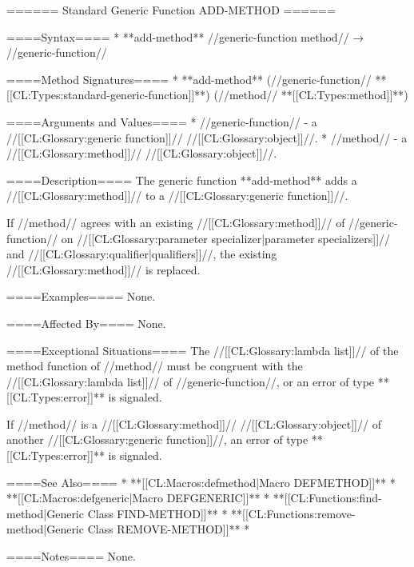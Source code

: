 ====== Standard Generic Function ADD-METHOD ======

====Syntax====
  * **add-method** //generic-function method// → //generic-function//

====Method Signatures====
  * **add-method** (//generic-function// **[[CL:Types:standard-generic-function]]**) (//method// **[[CL:Types:method]]**)

====Arguments and Values====
  * //generic-function// - a //[[CL:Glossary:generic function]]// //[[CL:Glossary:object]]//.
  * //method// - a //[[CL:Glossary:method]]// //[[CL:Glossary:object]]//.

====Description====
The generic function **add-method** adds a //[[CL:Glossary:method]]// to a //[[CL:Glossary:generic function]]//.

If //method// agrees with an existing //[[CL:Glossary:method]]// of //generic-function// on //[[CL:Glossary:parameter specializer|parameter specializers]]// and //[[CL:Glossary:qualifier|qualifiers]]//, the existing //[[CL:Glossary:method]]// is replaced.

====Examples====
None.

====Affected By====
None.

====Exceptional Situations====
The //[[CL:Glossary:lambda list]]// of the method function of //method// must be congruent with the //[[CL:Glossary:lambda list]]// of //generic-function//, or an error of type **[[CL:Types:error]]** is signaled.

If //method// is a //[[CL:Glossary:method]]// //[[CL:Glossary:object]]// of another //[[CL:Glossary:generic function]]//, an error of type **[[CL:Types:error]]** is signaled.

====See Also====
  * **[[CL:Macros:defmethod|Macro DEFMETHOD]]**
  * **[[CL:Macros:defgeneric|Macro DEFGENERIC]]**
  * **[[CL:Functions:find-method|Generic Class FIND-METHOD]]**
  * **[[CL:Functions:remove-method|Generic Class REMOVE-METHOD]]**
  * {\secref\SpecializerQualifierAgreement}

====Notes====
None.


